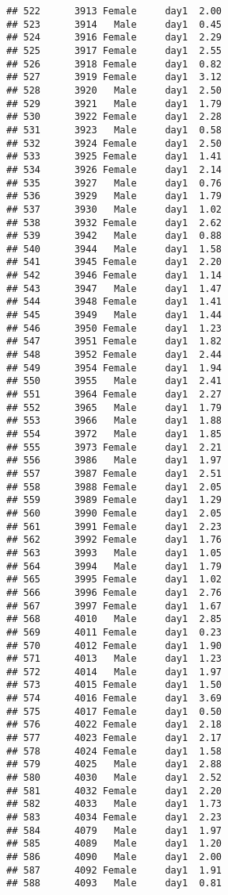 \documentclass[
]{article}
\begin{document}
\begin{verbatim}
## 522      3913 Female     day1  2.00
## 523      3914   Male     day1  0.45
## 524      3916 Female     day1  2.29
## 525      3917 Female     day1  2.55
## 526      3918 Female     day1  0.82
## 527      3919 Female     day1  3.12
## 528      3920   Male     day1  2.50
## 529      3921   Male     day1  1.79
## 530      3922 Female     day1  2.28
## 531      3923   Male     day1  0.58
## 532      3924 Female     day1  2.50
## 533      3925 Female     day1  1.41
## 534      3926 Female     day1  2.14
## 535      3927   Male     day1  0.76
## 536      3929   Male     day1  1.79
## 537      3930   Male     day1  1.02
## 538      3932 Female     day1  2.62
## 539      3942   Male     day1  0.88
## 540      3944   Male     day1  1.58
## 541      3945 Female     day1  2.20
## 542      3946 Female     day1  1.14
## 543      3947   Male     day1  1.47
## 544      3948 Female     day1  1.41
## 545      3949   Male     day1  1.44
## 546      3950 Female     day1  1.23
## 547      3951 Female     day1  1.82
## 548      3952 Female     day1  2.44
## 549      3954 Female     day1  1.94
## 550      3955   Male     day1  2.41
## 551      3964 Female     day1  2.27
## 552      3965   Male     day1  1.79
## 553      3966   Male     day1  1.88
## 554      3972   Male     day1  1.85
## 555      3973 Female     day1  2.21
## 556      3986   Male     day1  1.97
## 557      3987 Female     day1  2.51
## 558      3988 Female     day1  2.05
## 559      3989 Female     day1  1.29
## 560      3990 Female     day1  2.05
## 561      3991 Female     day1  2.23
## 562      3992 Female     day1  1.76
## 563      3993   Male     day1  1.05
## 564      3994   Male     day1  1.79
## 565      3995 Female     day1  1.02
## 566      3996 Female     day1  2.76
## 567      3997 Female     day1  1.67
## 568      4010   Male     day1  2.85
## 569      4011 Female     day1  0.23
## 570      4012 Female     day1  1.90
## 571      4013   Male     day1  1.23
## 572      4014   Male     day1  1.97
## 573      4015 Female     day1  1.50
## 574      4016 Female     day1  3.69
## 575      4017 Female     day1  0.50
## 576      4022 Female     day1  2.18
## 577      4023 Female     day1  2.17
## 578      4024 Female     day1  1.58
## 579      4025   Male     day1  2.88
## 580      4030   Male     day1  2.52
## 581      4032 Female     day1  2.20
## 582      4033   Male     day1  1.73
## 583      4034 Female     day1  2.23
## 584      4079   Male     day1  1.97
## 585      4089   Male     day1  1.20
## 586      4090   Male     day1  2.00
## 587      4092 Female     day1  1.91
## 588      4093   Male     day1  0.81

\end{verbatim}
\end{document}
